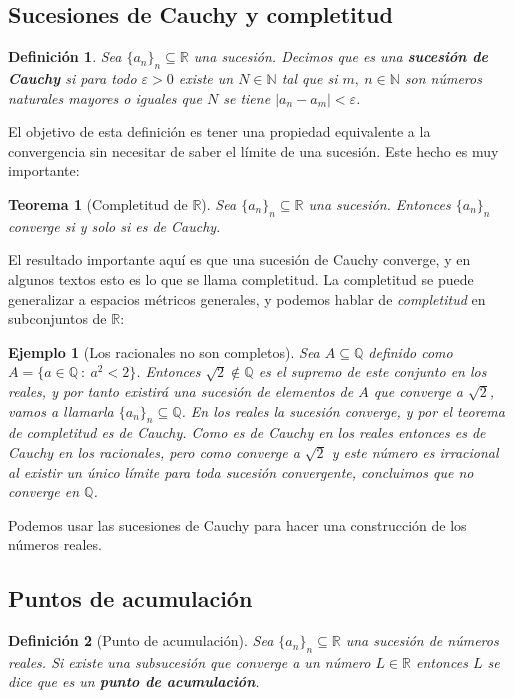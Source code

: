 \documentclass{article}
\newtheorem{theorem}{Teorema}
\newtheorem{define}{Definición}
\newtheorem{ejem}{Ejemplo}
\newcommand{\reales}{\mathbb{R}}
\newcommand{\naturales}{\mathbb{N}}
\newcommand{\racionales}{\mathbb{Q}}
\newcommand{\sucesion}[1]{\{ #1 _n \}_n}
\newcommand{\sucreal}[1]{\{ #1 _n \}_n \subseteq \reales}
\begin{document}
\subsection{Sucesiones de Cauchy y completitud}
\begin{define}
	Sea $\sucreal{a}$ una sucesión. Decimos que es una \textbf{sucesión de Cauchy} si para todo $\varepsilon > 0$ existe un $N \in \naturales$ tal que si $m,\ n \in \naturales$ son números naturales mayores o iguales que $N$ se tiene $|a_n - a_m| < \varepsilon$.
\end{define}
El objetivo de esta definición es tener una propiedad equivalente a la convergencia sin necesitar de saber el límite de una sucesión. Este hecho es muy importante:
\begin{theorem}[Completitud de $\reales$]
	Sea $\sucreal{a}$ una sucesión. Entonces $\sucesion{a}$ converge si y solo si es de Cauchy.
\end{theorem}
El resultado importante aquí es que una sucesión de Cauchy converge, y en algunos textos esto es lo que se llama completitud.
La completitud se puede generalizar a espacios métricos generales, y podemos hablar de \textit{completitud} en subconjuntos de $\reales$:
\begin{ejem}[Los racionales no son completos]
	Sea $A \subseteq \racionales$ definido como $A = \{ a\in \racionales\ :\ a^2 < 2\}$. Entonces $\sqrt{2} \not\in \racionales$ es el supremo de este conjunto en los reales, y por tanto existirá una sucesión de elementos de $A$ que converge a $\sqrt{2}$, vamos a llamarla $\sucesion{a} \subseteq \racionales$. En los reales la sucesión converge, y por el teorema de completitud es de Cauchy. Como es de Cauchy en los reales entonces es de Cauchy en los racionales, pero como converge a $\sqrt{2}$ y este número es irracional al existir un único límite para toda sucesión convergente, concluimos que no converge en $\racionales$.
\end{ejem}
Podemos usar las sucesiones de Cauchy para hacer una construcción de los números reales.



\subsection{Puntos de acumulación}
\begin{define}[Punto de acumulación]
	Sea $\sucreal{a}$ una sucesión de números reales. Si existe una subsucesión que converge a un número $L \in \reales$ entonces $L$ se dice que es un \textbf{punto de acumulación}.
\end{define}
\end{document}
